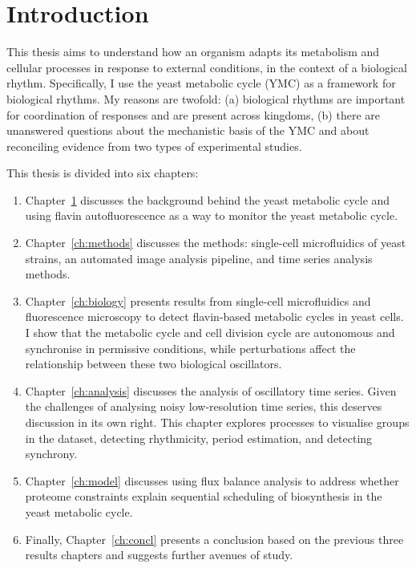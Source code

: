\chapter{Introduction}
\label{ch:intro}

This thesis aims to understand how an organism adapts its metabolism and cellular processes in response to external conditions, in the context of a biological rhythm.
Specifically, I use the yeast metabolic cycle (YMC) as a framework for biological rhythms.
My reasons are twofold: (a) biological rhythms are important for coordination of responses and are present across kingdoms, (b) there are unanswered questions about the mechanistic basis of the YMC and about reconciling evidence from two types of experimental studies.

This thesis is divided into six chapters:
\begin{enumerate}
  \item Chapter~\ref{ch:intro} discusses the background behind the yeast metabolic cycle and using flavin autofluorescence as a way to monitor the yeast metabolic cycle.
  \item Chapter~\ref{ch:methods} discusses the methods: single-cell microfluidics of yeast strains, an automated image analysis pipeline, and time series analysis methods.
  \item Chapter~\ref{ch:biology} presents results from single-cell microfluidics and fluorescence microscopy to detect flavin-based metabolic cycles in yeast cells.
        I show that the metabolic cycle and cell division cycle are autonomous and synchronise in permissive conditions, while perturbations affect the relationship between these two biological oscillators.
  \item Chapter~\ref{ch:analysis} discusses the analysis of oscillatory time series.
        Given the challenges of analysing noisy low-resolution time series, this deserves discussion in its own right.
        This chapter explores processes to visualise groups in the dataset, detecting rhythmicity, period estimation, and detecting synchrony.
  \item Chapter~\ref{ch:model} discusses using flux balance analysis to address whether proteome constraints explain sequential scheduling of biosynthesis in the yeast metabolic cycle.
  \item Finally, Chapter~\ref{ch:concl} presents a conclusion based on the previous three results chapters and suggests further avenues of study.
\end{enumerate}

